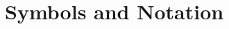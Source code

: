 			       



\chapter*{Symbols and Notation}

\begin{tabularx}{\textwidth}{ l X }


\end{tabularx}
